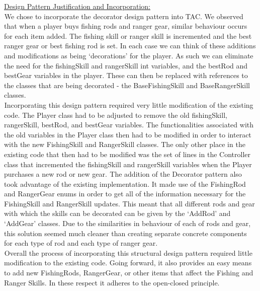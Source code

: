 \documentclass[letter paper, 12pt]{article}
\newcommand{\tab}{${}_{}$\hspace{0.2in}}
\newcommand{\noin}{\noindent}
\begin{document}
\noin \underline{Design Pattern Justification and Incorporation:}\\
\tab We chose to incorporate the decorator design pattern into TAC. We observed that when a player buys fishing rods and ranger gear, similar behaviour occurs for each item added. The fishing skill or ranger skill is incremented and the best ranger gear or best fishing rod is set. In each case we can think of these additions and modifications as being `decorations' for the player. As such we can eliminate the need for the fishingSkill and rangerSkill int variables, and the bestRod and bestGear variables in the player. These can then be replaced with references to the classes that are being decorated - the BaseFishingSkill and BaseRangerSkill classes. \\
\tab Incorporating this design pattern required very little modification of the existing code. The Player class had to be adjusted to remove the old fishingSkill, rangerSkill, bestRod, and bestGear variables. The functionalities associated with the old variables in the Player class then had to be modified in order to interact with the new FishingSkill and RangerSkill classes. The only other place in the existing code that then had to be modified was the set of lines in the Controller class that incremented the fishingSkill and rangerSkill variables when the Player purchases a new rod or new gear.
\tab The addition of the Decorator pattern also took advantage of the existing implementation. It made use of the FishingRod and RangerGear enums in order to get all of the information necessary for the FishingSkill and RangerSkill updates. This meant that all different rods and gear with which the skills can be decorated can be given by the `AddRod' and `AddGear' classes. Due to the similarities in behaviour of each of rods and gear, this solution seemed much cleaner than creating separate concrete components for each type of rod and each type of ranger gear.\\
\tab Overall the process of incorporating this structural design pattern required little modification to the existing code. Going forward, it also provides an easy means to add new FishingRods, RangerGear, or other items that affect the Fishing and Ranger Skills. In these respect it adheres to the open-closed principle.
\end{document}
